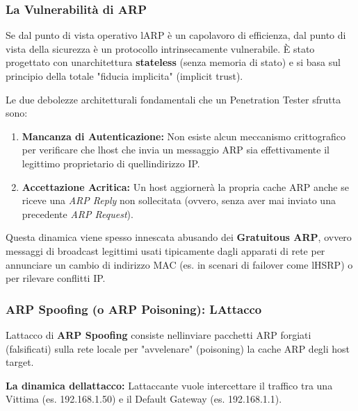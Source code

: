 \documentclass[11pt,a4paper]{article}
\begin{document}
\subsubsection{La Vulnerabilità di
ARP}\label{la-vulnerabilituxe0-di-arp}

Se dal punto di vista operativo l\textquotesingle ARP è un capolavoro di
efficienza, dal punto di vista della sicurezza è un protocollo
intrinsecamente vulnerabile. È stato progettato con
un\textquotesingle architettura \textbf{stateless} (senza memoria di
stato) e si basa sul principio della totale "fiducia implicita"
(implicit trust).

Le due debolezze architetturali fondamentali che un Penetration Tester
sfrutta sono:

\begin{enumerate}
\def\labelenumi{\arabic{enumi}.}
\item
  \textbf{Mancanza di Autenticazione:} Non esiste alcun meccanismo
  crittografico per verificare che l\textquotesingle host che invia un
  messaggio ARP sia effettivamente il legittimo proprietario di
  quell\textquotesingle indirizzo IP.
\item
  \textbf{Accettazione Acritica:} Un host aggiornerà la propria cache
  ARP anche se riceve una \emph{ARP Reply} non sollecitata (ovvero,
  senza aver mai inviato una precedente \emph{ARP Request}).
\end{enumerate}

Questa dinamica viene spesso innescata abusando dei \textbf{Gratuitous
ARP}, ovvero messaggi di broadcast legittimi usati tipicamente dagli
apparati di rete per annunciare un cambio di indirizzo MAC (es. in
scenari di failover come l\textquotesingle HSRP) o per rilevare
conflitti IP.

\subsubsection{ARP Spoofing (o ARP Poisoning):
L\textquotesingle Attacco}\label{arp-spoofing-o-arp-poisoning-lattacco}

L\textquotesingle attacco di \textbf{ARP Spoofing} consiste
nell\textquotesingle inviare pacchetti ARP forgiati (falsificati) sulla
rete locale per "avvelenare" (poisoning) la cache ARP degli host target.

\textbf{La dinamica dell\textquotesingle attacco:}
L\textquotesingle attaccante vuole intercettare il traffico tra una
Vittima (es. 192.168.1.50) e il Default Gateway (es. 192.168.1.1).
\end{document}
